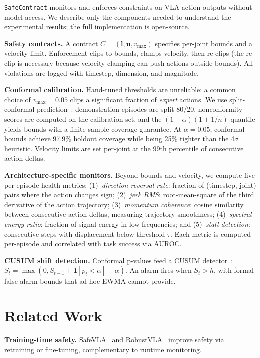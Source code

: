 \documentclass[conference]{IEEEtran}
\begin{document}
\texttt{SafeContract} monitors and enforces constraints on VLA action outputs without model access.
We describe only the components needed to understand the experimental results; the full implementation is open-source.

\textbf{Safety contracts.}
A contract $C = (\mathbf{l}, \mathbf{u}, v_{\max})$ specifies per-joint bounds and a velocity limit.
Enforcement clips to bounds, clamps velocity, then re-clips (the re-clip is necessary because velocity clamping can push actions outside bounds).
All violations are logged with timestep, dimension, and magnitude.

\textbf{Conformal calibration.}
Hand-tuned thresholds are unreliable: a common choice of $v_{\max}{=}0.05$ clips a significant fraction of \emph{expert} actions.
We use split-conformal prediction~\cite{vovk2005}: demonstration episodes are split 80/20, nonconformity scores are computed on the calibration set, and the $(1{-}\alpha)(1 + 1/n)$ quantile yields bounds with a finite-sample coverage guarantee.
At $\alpha{=}0.05$, conformal bounds achieve 97.9\% holdout coverage while being 25\% tighter than the 4$\sigma$ heuristic.
Velocity limits are set per-joint at the 99th percentile of consecutive action deltas.

\textbf{Architecture-specific monitors.}
Beyond bounds and velocity, we compute five per-episode health metrics: (1)~\emph{direction reversal rate}: fraction of (timestep, joint) pairs where the action changes sign; (2)~\emph{jerk RMS}: root-mean-square of the third derivative of the action trajectory; (3)~\emph{momentum coherence}: cosine similarity between consecutive action deltas, measuring trajectory smoothness; (4)~\emph{spectral energy ratio}: fraction of signal energy in low frequencies; and (5)~\emph{stall detection}: consecutive steps with displacement below threshold $\tau$.
Each metric is computed per-episode and correlated with task success via AUROC.

\textbf{CUSUM shift detection.}
Conformal p-values feed a CUSUM detector~\cite{page1954}: $S_t = \max(0, S_{t-1} + \mathbf{1}[p_t < \alpha] - \alpha)$.
An alarm fires when $S_t > h$, with formal false-alarm bounds that ad-hoc EWMA cannot provide.

\section{Related Work}

\textbf{Training-time safety.}
SafeVLA~\cite{safevla} and RobustVLA~\cite{robustvla} improve safety via retraining or fine-tuning, complementary to runtime monitoring.
\end{document}
